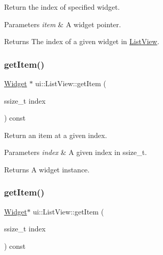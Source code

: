 Return the index of specified widget.


\begin{DoxyParams}{Parameters}
{\em item} & A widget pointer. \\
\hline
\end{DoxyParams}
\begin{DoxyReturn}{Returns}
The index of a given widget in \hyperlink{classui_1_1ListView}{List\+View}. 
\end{DoxyReturn}
\mbox{\label{classui_1_1ListView_adc14ba59d9dfa3064a7d9e77fadddd38}} 
\subsubsection{\texorpdfstring{get\+Item()}{getItem()}\hspace{0.1cm}{\footnotesize\ttfamily [1/2]}}
{\footnotesize\ttfamily \hyperlink{classui_1_1Widget}{Widget} $\ast$ ui\+::\+List\+View\+::get\+Item (\begin{DoxyParamCaption}\item[{ssize\+\_\+t}]{index }\end{DoxyParamCaption}) const}

Return an item at a given index.


\begin{DoxyParams}{Parameters}
{\em index} & A given index in ssize\+\_\+t. \\
\hline
\end{DoxyParams}
\begin{DoxyReturn}{Returns}
A widget instance. 
\end{DoxyReturn}
\mbox{\label{classui_1_1ListView_ae28dcb453c3cd18850e4f34975ca64b0}} 
\subsubsection{\texorpdfstring{get\+Item()}{getItem()}\hspace{0.1cm}{\footnotesize\ttfamily [2/2]}}
{\footnotesize\ttfamily \hyperlink{classui_1_1Widget}{Widget}$\ast$ ui\+::\+List\+View\+::get\+Item (\begin{DoxyParamCaption}\item[{ssize\+\_\+t}]{index }\end{DoxyParamCaption}) const}

